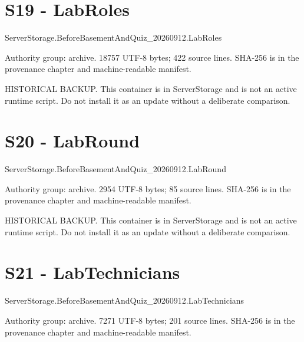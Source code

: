 \chapter{S19 - LabRoles}
\label{src:S19}
ServerStorage.\allowbreak{}BeforeBasementAndQuiz\_\allowbreak{}20260912.\allowbreak{}LabRoles

Authority group: archive.\allowbreak{} 18757 UTF-8 bytes; 422 source lines.\allowbreak{} SHA-256 is in the provenance chapter and machine-readable manifest.\allowbreak{}

HISTORICAL BACKUP.\allowbreak{} This container is in ServerStorage and is not an active runtime script.\allowbreak{} Do not install it as an update without a deliberate comparison.\allowbreak{}

\begingroup{}
\endgroup
\chapter{S20 - LabRound}
\label{src:S20}
ServerStorage.\allowbreak{}BeforeBasementAndQuiz\_\allowbreak{}20260912.\allowbreak{}LabRound

Authority group: archive.\allowbreak{} 2954 UTF-8 bytes; 85 source lines.\allowbreak{} SHA-256 is in the provenance chapter and machine-readable manifest.\allowbreak{}

HISTORICAL BACKUP.\allowbreak{} This container is in ServerStorage and is not an active runtime script.\allowbreak{} Do not install it as an update without a deliberate comparison.\allowbreak{}

\begingroup{}
\endgroup
\chapter{S21 - LabTechnicians}
\label{src:S21}
ServerStorage.\allowbreak{}BeforeBasementAndQuiz\_\allowbreak{}20260912.\allowbreak{}LabTechnicians

Authority group: archive.\allowbreak{} 7271 UTF-8 bytes; 201 source lines.\allowbreak{} SHA-256 is in the provenance chapter and machine-readable manifest.\allowbreak{}

